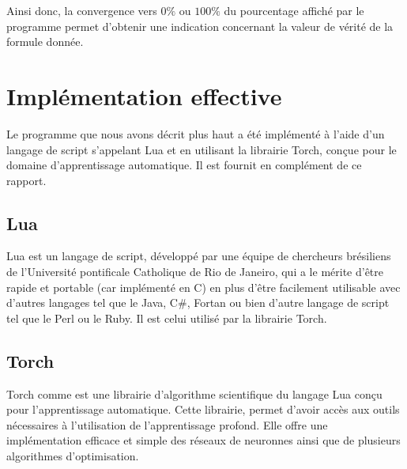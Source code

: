 \documentclass{article}
\begin{document}
	Ainsi donc, la convergence vers $0\%$ ou $100\%$ du pourcentage affiché par le programme permet d'obtenir une indication concernant la valeur de vérité de la formule donnée.\\
	
\section{Implémentation effective}
Le programme que nous avons décrit plus haut a été implémenté à l'aide d'un langage de script s'appelant Lua et en utilisant la librairie Torch, conçue pour le domaine d'apprentissage automatique. Il est fournit en complément de ce rapport.
	\subsection{Lua}
	Lua est un langage de script, développé par une équipe de chercheurs brésiliens de l'Université pontificale Catholique de Rio de Janeiro, qui a le mérite d'être rapide et portable (car implémenté en C) en plus d'être facilement utilisable avec d'autres langages tel que le Java, C\#, Fortan ou bien d'autre langage de script tel que le Perl ou le Ruby. Il est celui utilisé par la librairie Torch.
	
	\subsection{Torch}
	Torch comme est une librairie d'algorithme scientifique du langage Lua conçu pour l'apprentissage automatique. Cette librairie, permet d'avoir accès aux outils nécessaires à l'utilisation de l'apprentissage profond. Elle offre une implémentation efficace et simple des réseaux de neuronnes ainsi que de plusieurs algorithmes d'optimisation.\\

\end{document}
